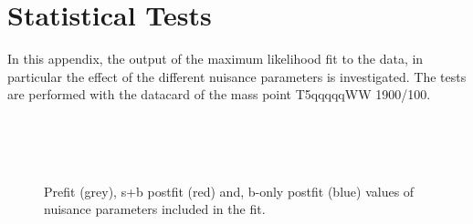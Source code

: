 \chapter{Statistical Tests}
\label{sec:nuisances}
In this appendix, the output of the maximum likelihood fit to the data, in particular the effect of the different nuisance parameters is investigated.
The tests are performed with the datacard of the mass point T5qqqqqWW 1900/100.
\begin{figure}[!hbtp]
\begin{center}
\\
 \\
\\
\end{center}
\caption{Prefit (grey), s+b postfit (red) and, b-only postfit (blue) values of nuisance parameters included in the fit. }
\label{fig:nuisances1}
\end{figure}

